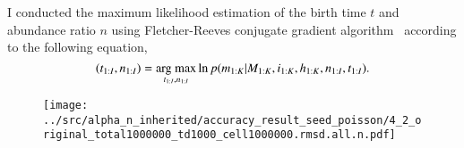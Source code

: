 \documentclass{article}
\begin{document}
I conducted the maximum likelihood estimation of the birth time $t$ and abundance ratio $n$ using Fletcher-Reeves conjugate gradient algorithm~\cite{fletcher1964function} according to the following equation,
\begin{equation}
  (t_{1:I}, n_{1:I}) = \mathop{\rm arg~max}\limits_{t_{1:I}, n_{1:I}} \ln p(m_{1:K} | M_{1:K}, i_{1:K}, h_{1:K}, n_{1:I}, t_{1:I}).
\end{equation}

\begin{figure}[H]
 \texttt{[image: ../src/alpha\_n\_inherited/accuracy\_result\_seed\_poisson/4\_2\_original\_total1000000\_td1000\_cell1000000.rmsd.all.n.pdf]}
\end{figure}
\end{document}

